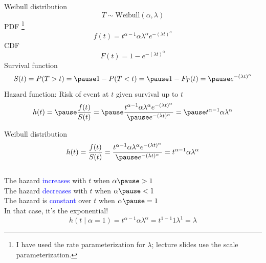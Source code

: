\documentclass{beamer}
\newcommand\blue[1]{{\color{blue}#1}}
\newcommand\bblue[1]{{\color{blue}\textbf{#1}}}
\newcommand\bgreen[1]{{\color{olive}\textbf{#1}}}
\begin{document}

\begin{frame}{Weibull distribution}
$$T\sim \text{Weibull} (\alpha,\lambda)$$
PDF \footnote{I have used the rate parameterization for $\lambda$; lecture slides use the scale parameterization.}
$$f(t) = t^{\alpha-1}\alpha\lambda^{\alpha} e^{-(\lambda t)^{\alpha}}$$
CDF
$$F(t) = 1 - e^{-(\lambda t)^{\alpha}}$$
Survival function
$$S(t) = P(T > t) = \pause 1 - P(T<t) = \pause 1 - F_T(t) = \pause e^{-(\lambda t)^{\alpha}}$$
Hazard function: \pause Risk of event at $t$ given survival up to $t$ \pause
$$h(t) = \pause \frac{f(t)}{S(t)} = \pause \frac{t^{\alpha-1}\alpha\lambda^{\alpha} e^{-(\lambda t)^{\alpha}}}{\pause e^{-(\lambda t)^{\alpha}}} = \pause t^{\alpha-1}\alpha\lambda^{\alpha}$$
\end{frame}

\begin{frame}{Weibull distribution}
$$h(t) = \frac{f(t)}{S(t)} = \frac{t^{\alpha-1}\alpha\lambda^{\alpha} e^{-(\lambda t)^{\alpha}}}{\pause e^{-(\lambda t)^{\alpha}}} = t^{\alpha-1}\alpha\lambda^{\alpha}$$ \pause \\
The hazard \textcolor{blue}{increases} with $t$ when $\alpha \pause > 1$ \pause \\
The hazard \textcolor{blue}{decreases} with $t$ when $\alpha \pause < 1$ \pause \\
The hazard is \textcolor{blue}{constant} over $t$ when $\alpha \pause = 1$ \pause \\
In that case, it's the exponential! \pause
$$h(t\mid \alpha = 1) = t^{\alpha-1}\alpha\lambda^{\alpha} = t^{1-1}1\lambda^{1} = \lambda$$
\end{frame}

\end{document}
